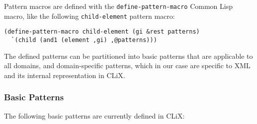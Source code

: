 \documentclass[a4paper,11pt]{scrartcl}
\begin{document}
Pattern macros are defined with the \texttt{define-pattern-macro}
Common Lisp macro, like the following \texttt{child-element} pattern
macro:

\begin{verbatim}
(define-pattern-macro child-element (gi &rest patterns)
  `(child (and1 (element ,gi) ,@patterns)))
\end{verbatim}

The defined patterns can be partitioned into basic patterns that are
applicable to all domains, and domain-specific patterns, which in our
case are specific to XML and its internal representation in CLiX.


\subsubsection{Basic Patterns}

The following basic patterns are currently defined in CLiX:
\end{document}
